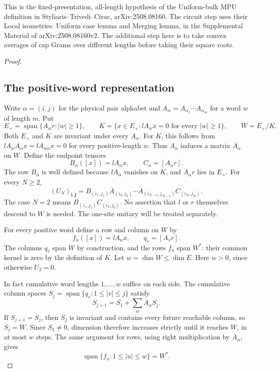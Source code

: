 \documentclass[11pt]{article}
\begin{document}
This is the fixed-presentation, all-length hypothesis of the
Uniform-bulk MPU definition in Styliaris--Trivedi--Cirac,
arXiv:2508.08160. The circuit step uses their Local isometries:
Uniform case lemma and Merging lemma, in the Supplemental Material
of arXiv:2508.08160v2. The additional step
here is to take convex averages of cap Grams over different lengths
before taking their square roots.

\begin{proof}
\subsection*{The positive-word representation}

Write $\alpha=(i,j)$ for the physical pair alphabet and
$A_w=A_{\alpha_1}\cdots A_{\alpha_m}$ for a word $w$ of length $m$.
Put
\[
 E_+=\operatorname{span}\{A_wr:|w|\geq1\},\qquad
 K=\{x\in E_+:lA_wx=0\text{ for every }|w|\geq1\},
 \qquad W=E_+/K.
\]
Both $E_+$ and $K$ are invariant under every $A_\alpha$.
For $K$, this follows from
$lA_wA_\alpha x=lA_{w\alpha}x=0$ for every positive-length $w$.
Thus $A_\alpha$ induces a matrix $\overline A_\alpha$ on $W$.
Define the endpoint tensors
\[
 B_\alpha([x])=lA_\alpha x,
 \qquad C_\alpha=[A_\alpha r].
\]
The row $B_\alpha$ is well defined because $lA_\alpha$ vanishes on
$K$, and $A_\alpha r$ lies in $E_+$. For every $N\geq2$,
\[
 (U_N)_{\mathbf i,\mathbf j}
 =B_{(i_1,j_1)}\overline A_{(i_2,j_2)}\cdots
       \overline A_{(i_{N-1},j_{N-1})}C_{(i_N,j_N)}.
\]
The case $N=2$ means $B_{(i_1,j_1)}C_{(i_2,j_2)}$.
No assertion that $l$ or $r$ themselves descend to $W$ is needed.
The one-site unitary will be treated separately.

For every positive word define a row and column on $W$ by
\[
 f_u([x])=lA_ux,\qquad q_v=[A_vr].
\]
The columns $q_v$ span $W$ by construction, and the rows $f_u$
span $W^*$: their common kernel is zero by the definition of $K$.
Let $w=\dim W\leq\dim E$. Here $w>0$, since otherwise $U_2=0$.

In fact cumulative word lengths $1,\ldots,w$ suffice on each side.
The cumulative column spaces $S_j=\operatorname{span}\{q_v:1\leq|v|\leq j\}$
satisfy
\[
 S_{j+1}=S_1+\sum_\alpha\overline A_\alpha S_j.
\]
If $S_{j+1}=S_j$, then $S_j$ is invariant and contains every
future reachable column, so $S_j=W$. Since $S_1\ne0$, dimension
therefore increases strictly until it reaches $W$, in at most
$w$ steps. The same argument for rows, using right multiplication
by $\overline A_\alpha$, gives
\[
 \operatorname{span}\{f_u:1\leq|u|\leq w\}=W^*.
\]


\end{proof}
\end{document}
